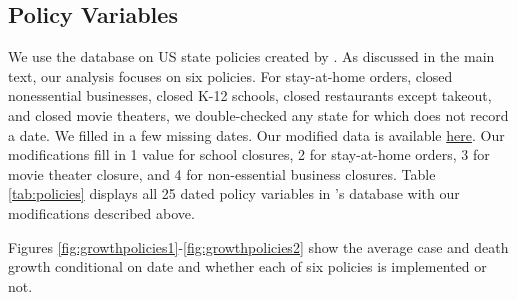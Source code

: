 \documentclass[3p, longtitle]{elsarticle}
\theoremstyle{definition}
\begin{document}
\subsection{Policy Variables}

We use the database on US state policies created by
\cite{raifman2020}. %
As discussed in the main text, our analysis focuses on six policies. For stay-at-home orders, closed nonessential
businesses, closed K-12 schools, closed restaurants except takeout,
and closed movie theaters, we double-checked any
state for which \cite{raifman2020} does not record a date. We filled
in a few missing dates. Our modified data is available
\href{"https://docs.google.com/spreadsheets/d/1E6HRkgbdSnZ9ZxrneydU6q4hhOCCt9oTl_5fa3OFVZE/edit?usp=sharing}{here}. Our
modifications fill in 1 value for school closures, 2 for stay-at-home orders, 3 for movie theater closure, and 4 for
non-essential business closures. Table \ref{tab:policies} displays all 25 dated policy variables in
\cite{raifman2020}'s database with our modifications described above.

Figures \ref{fig:growthpolicies1}-\ref{fig:growthpolicies2} show the  average case and death growth conditional on date and whether each of six policies  is implemented or not.


\afterpage{%
  \clearpage%
  \thispagestyle{empty}%
  \begin{landscape}%
    \centering %
    
  \end{landscape}
  \clearpage%
}
\end{document}
